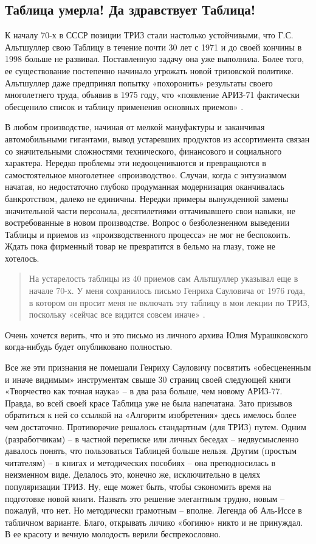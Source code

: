 \documentclass[11pt,a4paper]{article}
\begin{document}
\subsection*{Таблица умерла! Да здравствует Таблица!}

К началу 70-х в СССР позиции ТРИЗ стали настолько устойчивыми, что
Г.С. Альтшуллер свою Таблицу в течение почти 30 лет с 1971 и до своей кончины
в 1998 больше не развивал. Поставленную задачу она уже выполнила. Более того,
ее существование постепенно начинало угрожать новой тризовской политике.
Альтшуллер даже предпринял попытку «похоронить» результаты своего многолетнего
труда, объявив в 1975 году, что «появление АРИЗ-71 фактически обесценило
список и таблицу применения основных приемов» \cite{Altshuller1975}.

В любом производстве, начиная от мелкой мануфактуры и заканчивая
автомобильными гигантами, вывод устаревших продуктов из ассортимента связан со
значительными сложностями технического, финансового и социального характера.
Нередко проблемы эти недооцениваются и превращаются в самостоятельное
многолетнее «производство». Случаи, когда с энтузиазмом начатая, но
недостаточно глубоко продуманная модернизация оканчивалась банкротством,
далеко не единичны. Нередки примеры вынужденной замены значительной части
персонала, десятилетиями оттачивавшего свои навыки, не востребованные в новом
производстве. Вопрос о безболезненном выведении Таблицы и приемов из
«производственного процесса» не мог не беспокоить. Ждать пока фирменный товар
не превратится в бельмо на глазу, тоже не хотелось. 
\begin{quote}
  На устарелость таблицы из 40 приемов сам Альтшуллер указывал еще в начале
  70-х. У меня сохранилось письмо Генриха Сауловича от 1976 года, в котором он
  просит меня не включать эту таблицу в мои лекции по ТРИЗ, поскольку «сейчас
  все видится совсем иначе» \cite{Murashkovsky2006}.
\end{quote}
Очень хочется верить, что и это письмо из личного архива Юлия Мурашковского
когда-нибудь будет опубликовано полностью.

Все же эти признания не помешали Генриху Сауловичу посвятить «обесцененным и
иначе видимым» инструментам свыше 30 страниц своей следующей книги «Творчество
как точная наука» \cite{Altshuller1979} -- в два раза больше, чем новому
АРИЗ-77. Правда, во всей своей красе Таблица уже не была напечатана. Зато
призывов обратиться к ней со ссылкой на «Алгоритм изобретения» здесь имелось
более чем достаточно. Противоречие решалось стандартным (для ТРИЗ) путем.
Одним (разработчикам) -- в частной переписке или личных беседах --
недвусмысленно давалось понять, что пользоваться Таблицей больше нельзя.
Другим (простым читателям) -- в книгах и методических пособиях -- она
преподносилась в неизменном виде. Делалось это, конечно же, исключительно в
целях популяризации ТРИЗ. Ну, еще может быть, чтобы сэкономить время на
подготовке новой книги. Назвать это решение элегантным трудно, новым --
пожалуй, что нет. Но методически грамотным -- вполне. Легенда об Аль-Иссе в
табличном варианте. Благо, открывать личико «богиню» никто и не принуждал. В
ее красоту и вечную молодость верили беспрекословно.
\end{document}
